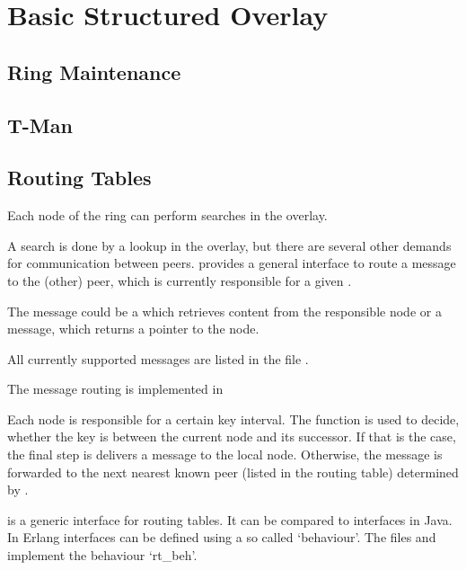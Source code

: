 \chapter{Basic Structured Overlay}

\section{Ring Maintenance}

\section{T-Man}

\section{Routing Tables}
\label{chapter.routing}

Each node of the ring can perform searches in the overlay.

A search is done by a lookup in the overlay, but there are several
other demands for communication between peers. \scalaris{} provides
a general interface to route a message to the (other) peer, which is
currently responsible for a given .


The message  could be a  which retrieves content from
the responsible node or a  message, which returns a pointer
to the node.

All currently supported messages are listed in the file .

The message routing is implemented in 


Each node is responsible for a certain key interval. The function
 is used to decide, whether the key is between
the current node and its successor. If that is the case, the final step is
delivers a  message to the local node. Otherwise, the message
is forwarded to the next nearest known peer (listed in the routing table)
determined by .

 is a generic interface for routing tables. It
can be compared to interfaces in Java. In Erlang interfaces can be
defined using a so called `behaviour'.  The files  and
 implement the behaviour `rt\_beh'.

